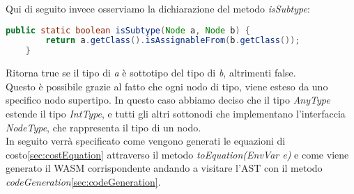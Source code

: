 \documentclass[../../main.tex]{subfiles}
\begin{document}
Qui di seguito invece osserviamo la dichiarazione del metodo \textit{isSubtype}:
\begin{lstlisting}[language=Java, caption={Metodo isSubtype}]
    public static boolean isSubtype(Node a, Node b) {
        return a.getClass().isAssignableFrom(b.getClass()); 
    }
\end{lstlisting}
Ritorna true se il tipo di \textit{a} è sottotipo del tipo di \textit{b}, altrimenti false.\\
Questo è possibile grazie al fatto che ogni nodo di tipo, viene esteso da uno specifico nodo supertipo. In questo caso abbiamo deciso che il tipo \textit{AnyType} estende il tipo \textit{IntType}, e tutti gli altri sottonodi che implementano l'interfaccia \textit{NodeType}, che rappresenta il tipo di un nodo.\\

In seguito verrà specificato come vengono generati le equazioni di costo\ref{sec:costEquation} attraverso il metodo \textit{toEquation(EnvVar e)} e come viene generato il WASM corrispondente andando a visitare l'AST con il metodo \textit{codeGeneration}\ref{sec:codeGeneration}.\\ 
\end{document}
